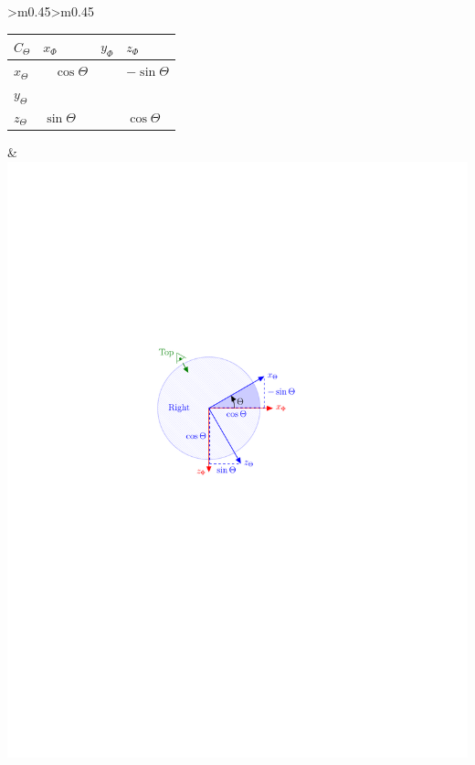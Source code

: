 \documentclass[12pt]{ucthesis}
\begin{document}
\begin{table}[!ht]
\begin{tabular}{>{\centering\arraybackslash}m{}>{\centering\arraybackslash}m{}}
	\\
	\midrule
		\begin{tabular}{>{\centering\arraybackslash}m{.25in}|>{\centering\arraybackslash}m{.5in}>{\centering\arraybackslash}m{.5in}>{\centering\arraybackslash}m{.5in}}
		$C_{\Theta}$ & $x_{\Phi}$ & $y_{\Phi}$ & $z_{\Phi}$\\ 
		\hline
		$x_{\Theta}$ & $\;\;\;\cos\Theta$ & 0 & $-\sin\Theta$ \\
		$y_{\Theta}$ & 0 & 1 & 0 \\
		$z_{\Theta}$ & $\sin\Theta$ & 0 & $\cos\Theta$ \\
		\end{tabular}
	&
		\includegraphics[clip=true, viewport=1.5in 5.2in 5.5in 7.6in, scale=.75]{figs/fig_dcm_2D_2.pdf}
	\\
	\midrule
		\begin{tabular}{>{\centering\arraybackslash}m{.25in}|>{\centering\arraybackslash}m{.5in}>{\centering\arraybackslash}m{.5in}>{\centering\arraybackslash}m{.5in}}

\end{tabular}
\end{tabular}
\end{table}
\end{document}
